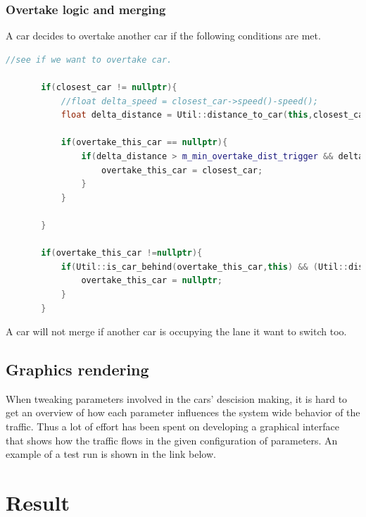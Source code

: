 \documentclass{article}
\begin{document}
    \subsubsection{Overtake logic and merging}
      A car decides to overtake another car if the following conditions are met.
      \begin{lstlisting}[language=C++]
          //see if we want to overtake car.

       if(closest_car != nullptr){
           //float delta_speed = closest_car->speed()-speed();
           float delta_distance = Util::distance_to_car(this,closest_car);

           if(overtake_this_car == nullptr){
               if(delta_distance > m_min_overtake_dist_trigger && delta_distance < m_max_overtake_dist_trigger && (target_speed()/closest_car->target_speed() > m_aggressiveness*1.0f ) && current_lane == 0 && closest_car->current_node->get_parent_segment()->get_lane_number(closest_car->current_node) == 0){
                   overtake_this_car = closest_car;
               }
           }

       }

       if(overtake_this_car !=nullptr){
           if(Util::is_car_behind(overtake_this_car,this) && (Util::distance_to_car(this,overtake_this_car) > m_overtake_done_dist)){
               overtake_this_car = nullptr;
           }
       }
      \end{lstlisting}
      A car will not merge if another car is occupying the lane it want to switch too.
  \subsection{Graphics rendering}
    When tweaking parameters involved in the cars' descision making, it is hard to
    get an overview of how each parameter influences the system wide behavior of the
    traffic. Thus a lot of effort has been spent on developing a graphical interface
    that shows how the traffic flows in the given configuration of parameters.
    An example of a test run is shown in the link below.
\section{Result}
\end{document}
